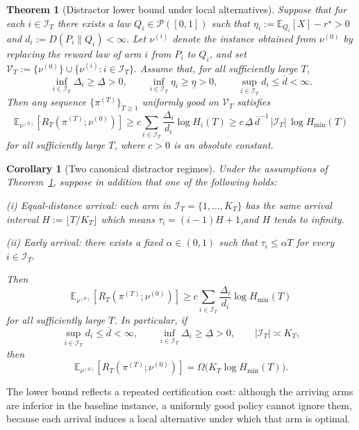 \documentclass[
  12pt]{article}
\newtheorem{theorem}{Theorem}
\newtheorem{corollary}{Corollary}
\begin{document}
\begin{theorem}[Distractor lower bound under local alternatives]
\label{thm:distractor-lb-local}
Suppose that for each $i\in\mathcal I_T$ there exists a law $Q_i\in\mathcal P([0,1])$ such that
\(
\eta_i:=\mathbb E_{Q_i}[X]-r^\star>0 \) and
\(
d_i:=D(P_i\|Q_i)<\infty.
\)
Let $\nu^{(i)}$ denote the instance obtained from $\nu^{(0)}$ by replacing the reward law
of arm $i$ from $P_i$ to $Q_i$, and set
\(
\mathcal V_T:=\{\nu^{(0)}\}\cup\{\nu^{(i)}:i\in\mathcal I_T\}.
\)
Assume that, for all sufficiently large $T$,
\[
\inf_{i\in\mathcal I_T}\Delta_i\ge \underline\Delta>0,
\qquad
\inf_{i\in\mathcal I_T}\eta_i\ge \underline\eta>0,
\qquad
\sup_{i\in\mathcal I_T}d_i\le \overline d<\infty.
\]
Then any sequence $\{\pi^{(T)}\}_{T\ge1}$ uniformly good on $\mathcal V_T$ satisfies
\[
\mathbb E_{\nu^{(0)}}[R_T(\pi^{(T)};\nu^{(0)})]
\ge
c\sum_{i\in\mathcal I_T}\frac{\Delta_i}{d_i}\log H_i(T)
\ge
c\,\underline\Delta\,\overline d^{-1}\,|\mathcal I_T|\,\log H_{\min}(T)
\]
for all sufficiently large $T$, where $c>0$ is an absolute constant.
\end{theorem}

\begin{corollary}[Two canonical distractor regimes]
\label{cor:distractor-lb-regimes}
Under the assumptions of Theorem~\ref{thm:distractor-lb-local}, suppose in addition that one
of the following holds:

\smallskip
\noindent
\textup{(i) Equal-distance arrival: } each arm in $\mathcal I_T=\{1,\dots,K_T\}$ has the same arrival interval $H:=\lfloor T/K_T\rfloor$ which means $\tau_i=(i-1)H+1$,and $H$ tends to infinity.

\smallskip
\noindent
\textup{(ii) Early arrival: } there exists a fixed $\alpha\in(0,1)$ such that
\(
\tau_i\le \alpha T\)
for every \(i\in\mathcal I_T.
\)

Then
\[
\mathbb E_{\nu^{(0)}}[R_T(\pi^{(T)};\nu^{(0)})]
\ge
c\sum_{i\in\mathcal I_T}\frac{\Delta_i}{d_i}\log H_{\min}(T)
\]
for all sufficiently large $T$. In particular, if
\[
\sup_{i\in\mathcal I_T} d_i\le \overline d<\infty,
\qquad
\inf_{i\in\mathcal I_T}\Delta_i\ge \underline\Delta>0,
\qquad
|\mathcal I_T|\asymp K_T,
\]
then
\[
\mathbb E_{\nu^{(0)}}[R_T(\pi^{(T)};\nu^{(0)})]
=
\Omega\bigl(K_T\log H_{\min}(T)\bigr).
\]
\end{corollary}

The lower bound reflects a repeated certification cost: although the arriving arms are inferior in
the baseline instance, a uniformly good policy cannot ignore them, because each arrival induces
a local alternative under which that arm is optimal.
\end{document}
